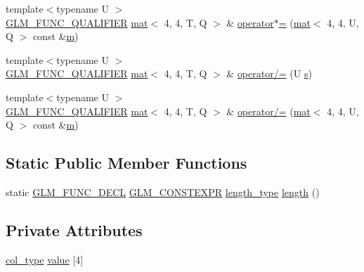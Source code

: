 \begin{DoxyCompactItemize}
\item 
{\footnotesize template$<$typename U $>$ }\\\mbox{\hyperlink{setup_8hpp_a33fdea6f91c5f834105f7415e2a64407}{G\+L\+M\+\_\+\+F\+U\+N\+C\+\_\+\+Q\+U\+A\+L\+I\+F\+I\+ER}} \mbox{\hyperlink{structglm_1_1mat}{mat}}$<$ 4, 4, T, Q $>$ \& \mbox{\hyperlink{structglm_1_1mat_3_014_00_014_00_01_t_00_01_q_01_4_aa2dcaab7e49dd355e77e8dba78946669}{operator$\ast$=}} (\mbox{\hyperlink{structglm_1_1mat}{mat}}$<$ 4, 4, U, Q $>$ const \&\mbox{\hyperlink{_s_d_l__opengl__glext_8h_af593500c283bf1a787a6f947f503a5c2}{m}})
\item 
{\footnotesize template$<$typename U $>$ }\\\mbox{\hyperlink{setup_8hpp_a33fdea6f91c5f834105f7415e2a64407}{G\+L\+M\+\_\+\+F\+U\+N\+C\+\_\+\+Q\+U\+A\+L\+I\+F\+I\+ER}} \mbox{\hyperlink{structglm_1_1mat}{mat}}$<$ 4, 4, T, Q $>$ \& \mbox{\hyperlink{structglm_1_1mat_3_014_00_014_00_01_t_00_01_q_01_4_a21ed80672db29c6d29a43ec8e53ae869}{operator/=}} (U \mbox{\hyperlink{_s_d_l__opengl_8h_a4af680a6c683f88ed67b76f207f2e6e4}{s}})
\item 
{\footnotesize template$<$typename U $>$ }\\\mbox{\hyperlink{setup_8hpp_a33fdea6f91c5f834105f7415e2a64407}{G\+L\+M\+\_\+\+F\+U\+N\+C\+\_\+\+Q\+U\+A\+L\+I\+F\+I\+ER}} \mbox{\hyperlink{structglm_1_1mat}{mat}}$<$ 4, 4, T, Q $>$ \& \mbox{\hyperlink{structglm_1_1mat_3_014_00_014_00_01_t_00_01_q_01_4_a7d40629b14a68cedd7aca94bcb81c5d9}{operator/=}} (\mbox{\hyperlink{structglm_1_1mat}{mat}}$<$ 4, 4, U, Q $>$ const \&\mbox{\hyperlink{_s_d_l__opengl__glext_8h_af593500c283bf1a787a6f947f503a5c2}{m}})
\end{DoxyCompactItemize}
\subsection*{Static Public Member Functions}
\begin{DoxyCompactItemize}
\item 
static \mbox{\hyperlink{setup_8hpp_ab2d052de21a70539923e9bcbf6e83a51}{G\+L\+M\+\_\+\+F\+U\+N\+C\+\_\+\+D\+E\+CL}} \mbox{\hyperlink{setup_8hpp_a08b807947b47031d3a511f03f89645ad}{G\+L\+M\+\_\+\+C\+O\+N\+S\+T\+E\+X\+PR}} \mbox{\hyperlink{structglm_1_1mat_3_014_00_014_00_01_t_00_01_q_01_4_ae06c2957874bbff5701b304668b5cb01}{length\+\_\+type}} \mbox{\hyperlink{structglm_1_1mat_3_014_00_014_00_01_t_00_01_q_01_4_a345a0bcf281399c047cb15a6551232b0}{length}} ()
\end{DoxyCompactItemize}
\subsection*{Private Attributes}
\begin{DoxyCompactItemize}
\item 
\mbox{\hyperlink{structglm_1_1mat_3_014_00_014_00_01_t_00_01_q_01_4_aad430dc291d0156d573c434be7fdecc1}{col\+\_\+type}} \mbox{\hyperlink{structglm_1_1mat_3_014_00_014_00_01_t_00_01_q_01_4_a43dd26acc0a0d26257b38393edc53328}{value}} \mbox{[}4\mbox{]}
\end{DoxyCompactItemize}



